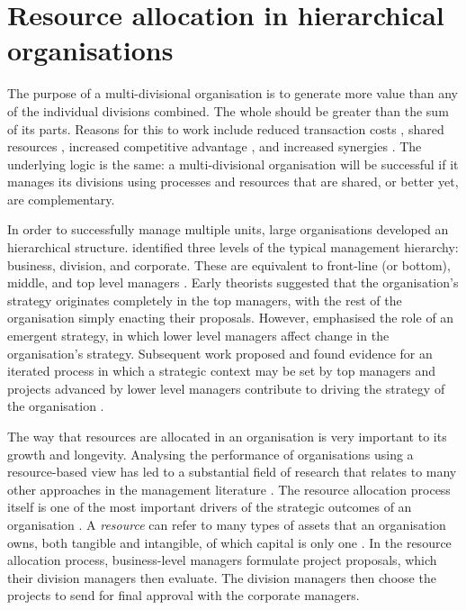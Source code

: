 \documentclass[a4paper, nobind, dvipsnames]{templates/ociamthesis}
\theoremstyle{definition}
\theoremstyle{definition}
\theoremstyle{definition}
\theoremstyle{definition}
\theoremstyle{remark}
\begin{document}
\section{Resource allocation in hierarchical organisations}

The purpose of a multi-divisional organisation is to generate more value than
any of the individual divisions combined. The whole should be greater than the
sum of its parts. Reasons for this to work include reduced transaction costs
\autocite{williamson1981,teece1982,teece1980,coase1937}, shared resources
\autocite{wernerfelt1984,barney1991}, increased competitive advantage \autocite{porter1998a,porter1998}, and increased synergies \autocite{barney1988}. The underlying logic is the
same: a multi-divisional organisation will be successful if it manages its
divisions using processes and resources that are shared, or better yet, are
complementary.

In order to successfully manage multiple units, large organisations developed an
hierarchical structure. \textcite{bower1970} identified three levels of the typical
management hierarchy: business, division, and corporate. These are equivalent to
front-line (or bottom), middle, and top level managers \autocite{noda1996}. Early
theorists suggested that the organisation's strategy originates completely in
the top managers, with the rest of the organisation simply enacting their
proposals. However, \textcite{mintzberg1985} emphasised the role of an emergent strategy,
in which lower level managers affect change in the organisation's strategy.
Subsequent work proposed and found evidence for an iterated process in which a
strategic context may be set by top managers and projects advanced by lower
level managers contribute to driving the strategy of the organisation
\autocite{noda1996,burgelman1983,bower1970}.

The way that resources are allocated in an organisation is very important to its
growth and longevity. Analysing the performance of organisations using a
resource-based view has led to a substantial field of research that relates to
many other approaches in the management literature \autocite{mahoney1992,barney1991}.
The resource allocation process itself is one of the most important drivers of
the strategic outcomes of an organisation \autocite{bower1970,bower2005}. A \emph{resource}
can refer to many types of assets that an organisation owns, both tangible and
intangible, of which capital is only one \autocite{wernerfelt1984}. In the resource
allocation process, business-level managers formulate project proposals, which
their division managers then evaluate. The division managers then choose the
projects to send for final approval with the corporate managers.
\end{document}
